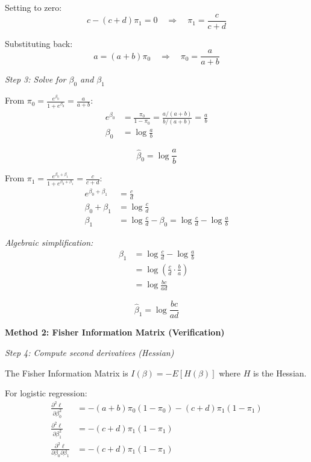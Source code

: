 \documentclass[12pt]{article}
\begin{document}
\begin{solution}
Setting to zero:
\begin{equation}
c - (c+d)\pi_1 = 0 \quad \Rightarrow \quad \pi_1 = \frac{c}{c+d}
\end{equation}

Substituting back:
\[
a = (a+b)\pi_0 \quad \Rightarrow \quad \pi_0 = \frac{a}{a+b}
\]

\textit{Step 3: Solve for $\beta_0$ and $\beta_1$}

From $\pi_0 = \frac{e^{\beta_0}}{1+e^{\beta_0}} = \frac{a}{a+b}$:
\begin{align*}
e^{\beta_0} &= \frac{\pi_0}{1-\pi_0} = \frac{a/(a+b)}{b/(a+b)} = \frac{a}{b} \\
\beta_0 &= \log\frac{a}{b}
\end{align*}

\[
\boxed{\hat{\beta}_0 = \log\frac{a}{b}}
\]

From $\pi_1 = \frac{e^{\beta_0+\beta_1}}{1+e^{\beta_0+\beta_1}} = \frac{c}{c+d}$:
\begin{align*}
e^{\beta_0+\beta_1} &= \frac{c}{d} \\
\beta_0 + \beta_1 &= \log\frac{c}{d} \\
\beta_1 &= \log\frac{c}{d} - \beta_0 = \log\frac{c}{d} - \log\frac{a}{b}
\end{align*}

\textit{Algebraic simplification:}
\begin{align*}
\beta_1 &= \log\frac{c}{d} - \log\frac{a}{b} \\
&= \log\left(\frac{c}{d} \cdot \frac{b}{a}\right) \\
&= \log\frac{bc}{ad}
\end{align*}

\[
\boxed{\hat{\beta}_1 = \log\frac{bc}{ad}}
\]

\textbf{Method 2: Fisher Information Matrix (Verification)}

\textit{Step 4: Compute second derivatives (Hessian)}

The Fisher Information Matrix is $I(\beta) = -E[H(\beta)]$ where $H$ is the Hessian.

For logistic regression:
\begin{align*}
\frac{\partial^2 \ell}{\partial \beta_0^2} &= -(a+b)\pi_0(1-\pi_0) - (c+d)\pi_1(1-\pi_1) \\
\frac{\partial^2 \ell}{\partial \beta_1^2} &= -(c+d)\pi_1(1-\pi_1) \\
\frac{\partial^2 \ell}{\partial \beta_0 \partial \beta_1} &= -(c+d)\pi_1(1-\pi_1)
\end{align*}


\end{solution}
\end{document}
